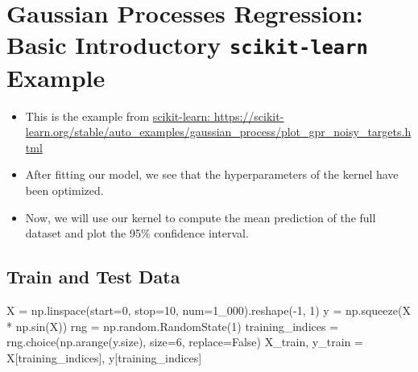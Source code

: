\documentclass[
  letterpaper,
  DIV=11,
  numbers=noendperiod]{scrreprt}
\newenvironment{Shaded}{\begin{snugshade}}{\end{snugshade}}
\newcommand{\DecValTok}[1]{\textcolor[rgb]{0.68,0.00,0.00}{#1}}
\newcommand{\NormalTok}[1]{\textcolor[rgb]{0.00,0.23,0.31}{#1}}
\newcommand{\OperatorTok}[1]{\textcolor[rgb]{0.37,0.37,0.37}{#1}}
\newcommand{\VariableTok}[1]{\textcolor[rgb]{0.07,0.07,0.07}{#1}}
\begin{document}
\hypertarget{gaussian-processes-regression-basic-introductory-scikit-learn-example}{%
\section{\texorpdfstring{Gaussian Processes Regression: Basic
Introductory \texttt{scikit-learn}
Example}{Gaussian Processes Regression: Basic Introductory scikit-learn Example}}\label{gaussian-processes-regression-basic-introductory-scikit-learn-example}}

\begin{itemize}
\item
  This is the example from
  \href{https://scikit-learn.org/stable/auto_examples/gaussian_process/plot_gpr_noisy_targets.html}{scikit-learn:
  https://scikit-learn.org/stable/auto\_examples/gaussian\_process/plot\_gpr\_noisy\_targets.html}
\item
  After fitting our model, we see that the hyperparameters of the kernel
  have been optimized.
\item
  Now, we will use our kernel to compute the mean prediction of the full
  dataset and plot the 95\% confidence interval.
\end{itemize}

\hypertarget{train-and-test-data}{%
\subsection{Train and Test Data}\label{train-and-test-data}}

\begin{Shaded}
\begin{Highlighting}[]
\NormalTok{X }\OperatorTok{=}\NormalTok{ np.linspace(start}\OperatorTok{=}\DecValTok{0}\NormalTok{, stop}\OperatorTok{=}\DecValTok{10}\NormalTok{, num}\OperatorTok{=}\DecValTok{1\_000}\NormalTok{).reshape(}\OperatorTok{{-}}\DecValTok{1}\NormalTok{, }\DecValTok{1}\NormalTok{)}
\NormalTok{y }\OperatorTok{=}\NormalTok{ np.squeeze(X }\OperatorTok{*}\NormalTok{ np.sin(X))}
\NormalTok{rng }\OperatorTok{=}\NormalTok{ np.random.RandomState(}\DecValTok{1}\NormalTok{)}
\NormalTok{training\_indices }\OperatorTok{=}\NormalTok{ rng.choice(np.arange(y.size), size}\OperatorTok{=}\DecValTok{6}\NormalTok{, replace}\OperatorTok{=}\VariableTok{False}\NormalTok{)}
\NormalTok{X\_train, y\_train }\OperatorTok{=}\NormalTok{ X[training\_indices], y[training\_indices]}
\end{Highlighting}
\end{Shaded}
\end{document}
